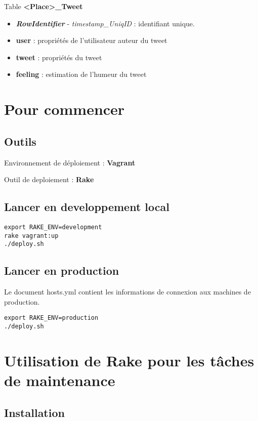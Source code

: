 \documentclass[a4paper,oneside,12pt]{article}
\begin{document}
Table \textbf{<Place>\_Tweet}
\begin{itemize}
\item \textbf{\textit{RowIdentifier}} - \textit{timestamp\_UniqID} : identifiant unique.
\item \textbf{user} : propriétés de l'utilisateur auteur du tweet
\item \textbf{tweet} : propriétés du tweet
\item \textbf{feeling} : estimation de l'humeur du tweet
\end{itemize}

\pagebreak

\section{Pour commencer}

\subsection{Outils}

Environnement de déploiement : \textbf{Vagrant}

Outil de deploiement : \textbf{Rake}

\subsection{Lancer en developpement local}

\begin{verbatim}
export RAKE_ENV=development
rake vagrant:up
./deploy.sh
\end{verbatim}

\subsection{Lancer en production}

Le document hosts.yml contient les informations de connexion aux machines de production. 

\begin{verbatim}
export RAKE_ENV=production
./deploy.sh
\end{verbatim}

\pagebreak
\section{Utilisation de Rake pour les tâches de maintenance}

\subsection{Installation}
\end{document}
